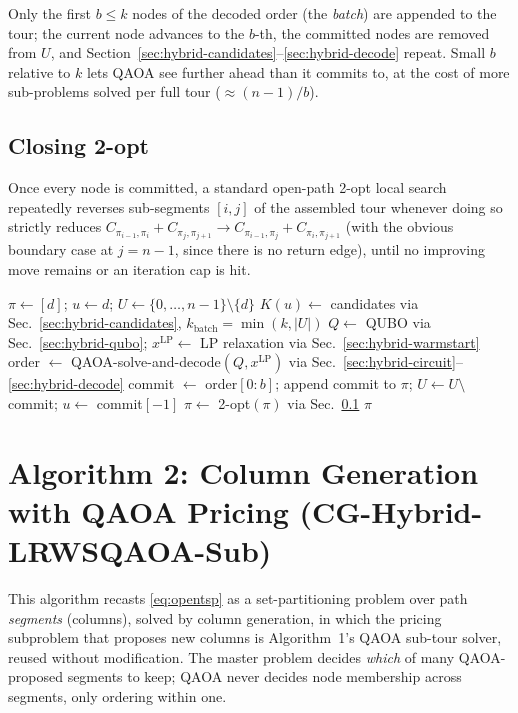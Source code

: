 \documentclass[11pt]{article}
\begin{document}
Only the first $b \le k$ nodes of the decoded order (the \emph{batch}) are appended to the tour; the current node advances to the $b$-th, the committed nodes are removed from $U$, and Section~\ref{sec:hybrid-candidates}--\ref{sec:hybrid-decode} repeat. Small $b$ relative to $k$ lets QAOA see further ahead than it commits to, at the cost of more sub-problems solved per full tour ($\approx (n{-}1)/b$).

\subsection{Closing 2-opt}
\label{sec:hybrid-2opt}

Once every node is committed, a standard open-path 2-opt local search repeatedly reverses sub-segments $[i,j]$ of the assembled tour whenever doing so strictly reduces $C_{\pi_{i-1},\pi_i} + C_{\pi_j,\pi_{j+1}} \to C_{\pi_{i-1},\pi_j} + C_{\pi_i,\pi_{j+1}}$ (with the obvious boundary case at $j = n{-}1$, since there is no return edge), until no improving move remains or an iteration cap is hit.

\begin{algorithm}
\caption{WS-LR-QAOA with Receding Horizon}
\begin{algorithmic}[1]
\State $\pi \gets [d]$; $u \gets d$; $U \gets \{0,\dots,n-1\}\setminus\{d\}$
  \State $K(u) \gets$ candidates via Sec.~\ref{sec:hybrid-candidates}, $k_{\mathrm{batch}} = \min(k, |U|)$
  \State $Q \gets$ QUBO via Sec.~\ref{sec:hybrid-qubo}; $x^{\mathrm{LP}} \gets$ LP relaxation via Sec.~\ref{sec:hybrid-warmstart}
  \State order $\gets$ QAOA-solve-and-decode$(Q, x^{\mathrm{LP}})$ via Sec.~\ref{sec:hybrid-circuit}--\ref{sec:hybrid-decode}
  \State commit $\gets$ order$[0{:}b]$; append commit to $\pi$; $U \gets U \setminus$ commit; $u \gets$ commit$[-1]$
\EndWhile
\State $\pi \gets$ 2-opt$(\pi)$ via Sec.~\ref{sec:hybrid-2opt}
\State \Return $\pi$
\end{algorithmic}
\end{algorithm}

\section{Algorithm 2: Column Generation with QAOA Pricing (CG-Hybrid-LRWSQAOA-Sub)}
\label{sec:cg}

This algorithm recasts \eqref{eq:opentsp} as a set-partitioning problem over path \emph{segments} (columns), solved by column generation, in which the pricing subproblem that proposes new columns is Algorithm~1's QAOA sub-tour solver, reused without modification. The master problem decides \emph{which} of many QAOA-proposed segments to keep; QAOA never decides node membership across segments, only ordering within one.
\end{document}
